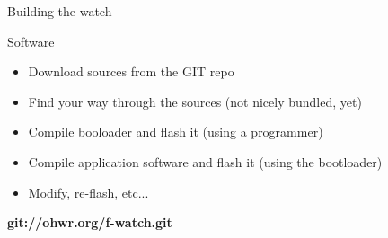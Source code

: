 \documentclass[compress,red]{beamer}
\begin{document}
\begin{frame}{Building the watch}

  Software

  \begin{itemize}
  \item Download sources from the GIT repo
  \item Find your way through the sources (not nicely bundled, yet)
  \item Compile booloader and flash it (using a programmer)
  \item Compile application software and flash it (using the bootloader)
  \item Modify, re-flash, etc...
  \end{itemize}

  \begin{center}
    \textbf{git://ohwr.org/f-watch.git}
  \end{center}

  \note[item]{}

\end{frame}
\end{document}
